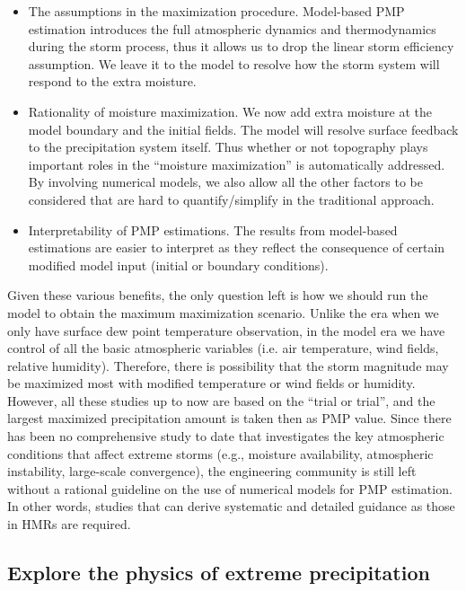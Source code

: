 \begin{itemize}
\item The assumptions in the maximization procedure. Model-based PMP estimation introduces the full atmospheric dynamics and thermodynamics during the storm process, thus it allows us to drop the linear storm efficiency assumption. We leave it to the model to resolve how the storm system will respond to the extra moisture.

\item Rationality of moisture maximization. We now add extra moisture at the model boundary and the initial fields. The model will resolve surface feedback to the precipitation system itself. Thus whether or not topography plays important roles in the ``moisture maximization'' is automatically addressed. By involving numerical models, we also allow all the other factors to be considered that are hard to quantify/simplify in the traditional approach.

\item Interpretability of PMP estimations. The results from model-based estimations are easier to interpret as they reflect the consequence of certain modified model input (initial or boundary conditions).
\end{itemize}

Given these various benefits, the only question left is how we should run the model to obtain the maximum maximization scenario. Unlike the era when we only have surface dew point temperature observation, in the model era we have control of all the basic atmospheric variables (i.e. air temperature, wind fields, relative humidity). Therefore, there is possibility that the storm magnitude may be maximized most with modified temperature or wind fields or humidity. However, all these studies up to now are based on the ``trial or trial'', and the largest maximized precipitation amount is taken then as PMP value. Since there has been no comprehensive study to date that investigates the key atmospheric conditions that affect extreme storms (e.g., moisture availability, atmospheric instability, large-scale convergence), the engineering community is still left without a rational guideline on the use of numerical models for PMP estimation. In other words, studies that can derive systematic and detailed guidance as those in HMRs are required.

\subsection{Explore the physics of extreme precipitation}

